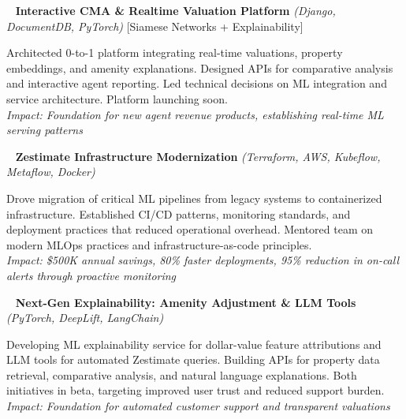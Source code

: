 \documentclass[11pt,letterpaper]{article}
\newcommand{\smallersection}{\small}
\newcommand{\impact}[1]{\textit{Impact: #1}}
\newcommand{\tech}[1]{\textit{(#1)}}
\newcommand{\approach}[1]{[#1]}
\newenvironment{projectentry}{%
    \leftskip=0.5cm
    \par\noindent
}{\par\leftskip=0cm\vspace{-2pt}}
\newenvironment{projectdesc}{%
    \leftskip=1.0cm
    \footnotesize
    \par\noindent
}{\par\leftskip=0cm\smallersection\vspace{-3pt}}
\newcommand{\projicon}[1]{%
    {\small\color{gray!70}#1}~%
}
\begin{document}
\begin{projectentry}
    \projicon{\faChartLine} \textbf{Interactive CMA \& Realtime Valuation Platform} \tech{Django, DocumentDB, PyTorch} \approach{Siamese Networks + Explainability}
\end{projectentry}

\begin{projectdesc}
    Architected 0-to-1 platform integrating real-time valuations, property embeddings, and amenity explanations. Designed APIs for comparative analysis and interactive agent reporting. Led technical decisions on ML integration and service architecture. Platform launching soon.\\[1pt]
    \impact{Foundation for new agent revenue products, establishing real-time ML serving patterns}
\end{projectdesc}

\begin{projectentry}
    \projicon{\faServer} \textbf{Zestimate Infrastructure Modernization} \tech{Terraform, AWS, Kubeflow, Metaflow, Docker}
\end{projectentry}

\begin{projectdesc}
    Drove migration of critical ML pipelines from legacy systems to containerized infrastructure. Established CI/CD patterns, monitoring standards, and deployment practices that reduced operational overhead. Mentored team on modern MLOps practices and infrastructure-as-code principles.\\[1pt]
    \impact{\$500K annual savings, 80\% faster deployments, 95\% reduction in on-call alerts through proactive monitoring}
\end{projectdesc}

\begin{projectentry}
    \projicon{\faBuilding} \textbf{Next-Gen Explainability: Amenity Adjustment \& LLM Tools} \tech{PyTorch, DeepLift, LangChain} 
\end{projectentry}

\begin{projectdesc}
    Developing ML explainability service for dollar-value feature attributions and LLM tools for automated Zestimate queries. Building APIs for property data retrieval, comparative analysis, and natural language explanations. Both initiatives in beta, targeting improved user trust and reduced support burden.\\[1pt]
    \impact{Foundation for automated customer support and transparent valuations}
\end{projectdesc}
\end{document}
